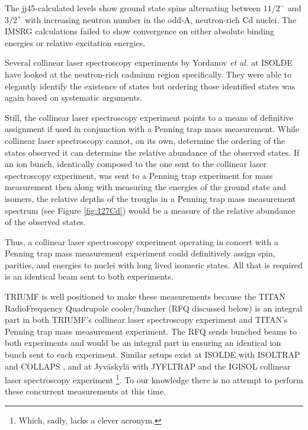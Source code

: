 \documentclass[12pt]{article}
\begin{document}
The jj45-calculated levels show ground state spins alternating between $11/2^-$ and $3/2^+$ with increasing neutron number in the odd-A, neutron-rich Cd nuclei. The IMSRG calculations failed to show convergence on either absolute binding energies or relative excitation energies. 

Several collinear laser spectroscopy experiments by Yordanov \emph{et al.} at ISOLDE \cite{Yordanov2013,Yordanov2016} have looked at the neutron-rich cadmium region specifically. They were able to elegantly identify the existence of states but ordering those identified states was again based on systematic arguments.

Still, the collinear laser spectroscopy experiment points to a means of definitive assignment if used in conjunction with a Penning trap mass measurement. While collinear laser spectroscopy cannot, on its own, determine the ordering of the states observed it can determine the relative abundance of the observed states. If an ion bunch, identically composed to the one sent to the collinear laser spectroscopy experiment, was sent to a Penning trap experiment for mass measurement then along with measuring the energies of the ground state and isomers, the relative depths of the troughs in a Penning trap mass measurement spectrum (see Figure \ref{fig:127Cd}) would be a measure of the relative abundance of the observed states.

Thus, a collinear laser spectroscopy experiment operating in concert with a Penning trap mass measurement experiment could definitively assign spin, parities, and energies to nuclei with long lived isomeric states. All that is required is an identical beam sent to both experiments.

TRIUMF is well positioned to make these measurements because the TITAN RadioFrequency Quadrupole cooler/buncher (RFQ discussed below) is an integral part in both TRIUMF's collinear laser spectroscopy experiment and TITAN's Penning trap mass measurement experiment. The RFQ sends bunched beams to both experiments \cite{Brunner2012a} and would be an integral part in ensuring an identical ion bunch sent to each experiment. Similar setups exist at ISOLDE with ISOLTRAP \cite{Bollen2001} and COLLAPS \cite{Papuga2014}, and at Jyv\"{a}skyl\"{a} with JYFLTRAP \cite{Kolhinen2004} and the IGISOL collinear laser spectroscopy experiment \cite{Billowes2000}\footnote{Which, sadly, lacks a clever acronym.}. To our knowledge there is no attempt to perform these concurrent measurements at this time.
\end{document}
